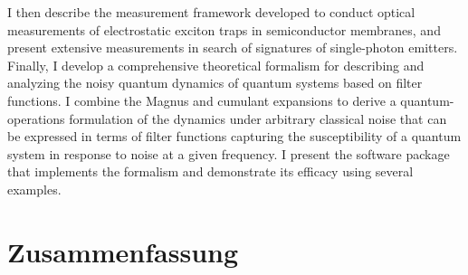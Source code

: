 I then describe the \mjolnir measurement framework developed to conduct optical measurements of electrostatic exciton traps in semiconductor membranes, and present extensive measurements in search of signatures of single-photon emitters.
Finally, I develop a comprehensive theoretical formalism for describing and analyzing the noisy quantum dynamics of quantum systems based on filter functions.
I combine the Magnus and cumulant expansions to derive a quantum-operations formulation of the dynamics under arbitrary classical noise that can be expressed in terms of filter functions capturing the susceptibility of a quantum system in response to noise at a given frequency.
I present the \filterfunctions software package that implements the formalism and demonstrate its efficacy using several examples.

\chapter*{Zusammenfassung}
